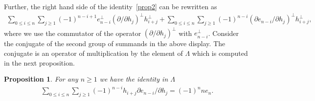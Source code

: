\documentclass[11pt]{article}
\newtheorem{proposition}{Proposition}
\numberwithin{equation}{section}
\renewcommand\ge{\geqslant}
\renewcommand\le{\leqslant}
\begin{document}
Further, the right hand side of the identity~\eqref{prop2} can be rewritten as
\begin{gather*}
\sum_{0\le i\le n}\sum_{j\ge1}(-1)^{n-i+1}e_{n-i}^{\perp}(\partial /\partial h_j)^{\perp}
h_{i+j}^{\perp}+\sum_{0\le i\le n}\sum_{j\ge1}(-1)^{n-i}(\partial e_{n-i}/\partial h_j)^{\perp}h_{i+j}^{\perp},
\end{gather*}
where we use the commutator of the operator $(\partial /\partial
h_j)^{\perp}$ with $e_{ n-i}^{\perp}$.
Consider the conjugate of the second group of summands in the above display.
The conjugate is an operator of multiplication by the element of $\Lambda$ which is computed in the next
proposition.
\begin{proposition}\label{Prop3}
For any $n\ge1$ we have the identity in $\Lambda$
\begin{gather}
\label{prop3}
\sum_{0\le i\le n}\sum_{j\ge1}(-1)^{n-i}h_{i+j}
\partial e_{n-i}/\partial
h_j=(-1)^nne_n.
\end{gather}
\end{proposition}
\end{document}
